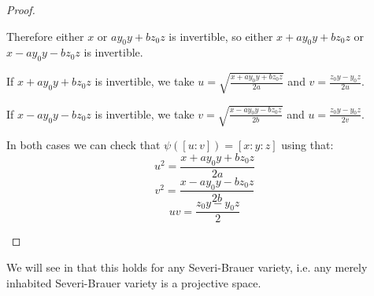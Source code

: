 \begin{proof}
\begin{itemize}
Therefore either $x$ or $ay_0y+bz_0z$ is invertible, so either $x+ay_0y+bz_0z$ or $x-ay_0y-bz_0z$ is invertible.

If $x+ay_0y+bz_0z$ is invertible, we take $u=\sqrt{\frac{x+ay_0y+bz_0z}{2a}}$ and $v = \frac{z_0y-y_0z}{2u}$.

If $x-ay_0y-bz_0z$ is invertible, we take $v=\sqrt{\frac{x-ay_0y-bz_0z}{2b}}$ and $u = \frac{z_0y-y_0z}{2v}$.

In both cases we can check that $\psi([u:v]) = [x:y:z]$ using that:
\[u^2 = \frac{x+ay_0y+bz_0z}{2a}\]
\[v^2 = \frac{x-ay_0y-bz_0z}{2b}\]
\[uv = \frac{z_0y-y_0z}{2}\]
\end{itemize}
\end{proof}

\begin{remark}
We will see in  that this holds for any Severi-Brauer variety, i.e. any merely inhabited Severi-Brauer variety is a projective space. 
\end{remark}